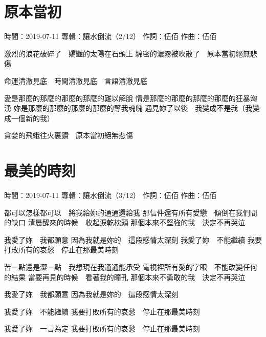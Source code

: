 \documentclass[UTF8,a4paper,oneside,twocolumn,12pt]{ctexbook}
\newcommand{\infopair}[2]{\textbullet #1：#2}
\newcommand{\zc}[1][伍佰]{\infopair{作詞}{#1}}
\newcommand{\zq}[1][伍佰]{\infopair{作曲}{#1}}
\newcommand{\zj}[1]{\infopair{專輯}{#1}}
\newcommand{\sj}[1]{\infopair{時間}{#1}}
\newenvironment{info}{\begin{flushleft}\kaishu
	}
	{\end{flushleft}\normalsize\yahei\par}
\newenvironment{lyric}{
	}
{}
\begin{document}
\section{原本當初}
\begin{info}
	\sj{2019-07-11}
	\zj{讓水倒流（2/12）}
	\zc
	\zq
\end{info}
\begin{lyric}
	激烈的浪花破碎了　嬌豔的太陽在石頭上
	綿密的濃霧被吹散了　原本當初絕無悲傷

	命運清澈見底　時間清澈見底　言語清澈見底

	愛是那麼的那麼的那麼的那麼的難以解脫
	情是那麼的那麼的那麼的那麼的狂暴洶湧
	妳是那麼的那麼的那麼的那麼的奪我魂魄
	遇見妳了以後　我變成不是我（我變成一個新的我）

	貪婪的飛蛾往火裏鑽　原本當初絕無悲傷
\end{lyric}

\section{最美的時刻}
\begin{info}
	\sj{2019-07-11}
	\zj{讓水倒流（3/12）}
	\zc
	\zq
\end{info}
\begin{lyric}
	都可以怎樣都可以　將我給妳的通通還給我
	那信件還有所有愛戀　傾倒在我們間的缺口
	清晨醒來的時候　收起淚乾枕頭
	那個本來不堅強的我　決定不再哭泣

	我愛了妳　我都願意
	因為我就是妳的　這段感情太深刻
	我愛了妳　不能繼續
	我要打敗所有的哀愁　停止在那最美時刻

	苦一點還是澀一點　我想現在我通通能承受
	電視裡所有愛的字眼　不能改變任何的結果
	當要再見的時候　看著我的瞳孔
	那個本來不勇敢的我　決定不再哭泣

	我愛了妳　我都願意
	因為我就是妳的　這段感情太深刻

	我愛了妳　不能繼續
	我要打敗所有的哀愁　停止在那最美時刻

	我愛了妳　一言為定
	我要打敗所有的哀愁　停止在那最美時刻
\end{lyric}
\end{document}
